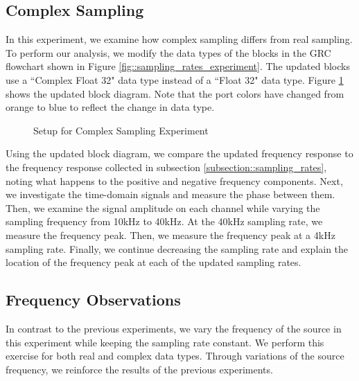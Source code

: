 \documentclass{article}
\begin{document}
\subsection{Complex Sampling \label{subsection::complex_sampling}}

In this experiment, we examine how complex sampling differs from real sampling. To perform our analysis, we modify the data types of the blocks in the GRC flowchart shown in Figure \ref{fig::sampling_rates_experiment}. The updated blocks use a ``Complex Float 32" data type instead of a ``Float 32" data type. Figure \ref{fig::complex_sampling_experiment} shows the updated block diagram. Note that the port colors have changed from orange to blue to reflect the change in data type.

\begin{figure}[H]
	\centerline{}
	\caption{Setup for Complex Sampling Experiment}
	\label{fig::complex_sampling_experiment}
\end{figure}

Using the updated block diagram, we compare the updated frequency response to the frequency response collected in subsection \ref{subsection::sampling_rates}, noting what happens to the positive and negative frequency components. Next, we investigate the time-domain signals and measure the phase between them. Then, we examine the signal amplitude on each channel while varying the sampling frequency from 10kHz to 40kHz. At the 40kHz sampling rate, we measure the frequency peak. Then, we measure the frequency peak at a 4kHz sampling rate. Finally, we continue decreasing the sampling rate and explain the location of the frequency peak at each of the updated sampling rates.

\subsection{Frequency Observations}

In contrast to the previous experiments, we vary the frequency of the source in this experiment while keeping the sampling rate constant. We perform this exercise for both real and complex data types. Through variations of the source frequency, we reinforce the results of the previous experiments.
\end{document}
